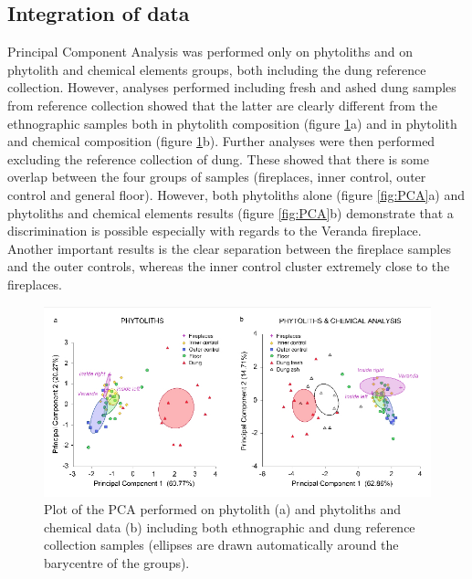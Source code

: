 \documentclass[authoryear,preprint,review,12pt]{elsarticle}
\begin{document}
\subsection{Integration of data}
\label{subsec:3.3}	
Principal Component Analysis was performed only on phytoliths and on phytolith and chemical elements groups, both including the dung reference collection. However, analyses performed including fresh and ashed dung samples from reference collection showed that the latter are clearly different from the ethnographic samples both in phytolith composition (figure \ref{fig:dungPCA}a) and in phytolith and chemical composition (figure \ref{fig:dungPCA}b). Further analyses were then performed excluding the reference collection of dung. These showed that there is some overlap between the four groups of samples (fireplaces, inner control, outer control and general floor). However, both phytoliths alone (figure \ref{fig:PCA}a) and phytoliths and chemical elements results (figure \ref{fig:PCA}b) demonstrate that a discrimination is possible especially with regards to the Veranda fireplace. Another important results is the clear separation between the fireplace samples and the outer controls, whereas the inner control cluster extremely close to the fireplaces.

\begin{figure}[ht!]
  \begin{center}
    \includegraphics[width=15cm]{figures/PCA_dung}
    \caption{Plot of the PCA performed on phytolith (a) and phytoliths and chemical data (b) including both ethnographic and dung reference collection samples (ellipses are drawn automatically around the barycentre of the groups).}
    \label{fig:dungPCA}
  \end{center}
\end{figure}
\end{document}
